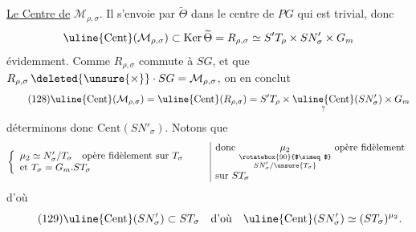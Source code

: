 
\uline{Le Centre de} $\mathcal M_{\rho,\sigma}$. Il s'envoie par $\widetilde\Theta$ dans le centre de $PG$ qui est trivial, donc
\[
\uline{\mathrm{Cent}}(\mathcal M_{\rho,\sigma})\subset\operatorname{Ker}\widetilde\Theta
=R_{\rho,\sigma}\simeq S'T_\rho\times SN'_\sigma\times G_m
\]
 évidemment. Comme $R_{\rho,\sigma}$ commute à $SG$, et que $R_{\rho,\sigma}\,\deleted{\unsure{\times}}\cdot SG=\mathcal M_{\rho,\sigma}$, on en conclut
\[
\tag{128}
\uline{\mathrm{Cent}}(\mathcal M_{\rho,\sigma})
=\uline{\mathrm{Cent}}(R_{\rho,\sigma})
=S'T_\rho\times\underset{?}{\uline{\mathrm{Cent}}}(SN'_\sigma)\times G_m
\]
déterminons donc $\mathrm{Cent}(SN'_\sigma)$. Notons que
\[
\left\{\begin{array}{l}
\mu_2\simeq N'_\sigma/T_\sigma\quad\text{opère fidèlement sur }T_\sigma\\
\text{et }T_\sigma=G_m.ST_\sigma
\end{array}\right.
\qquad
\begin{array}{|l}
\text{donc }\underset{\substack{\rotatebox{90}{$\simeq$}\\SN'_\sigma/\unsure{T_\sigma}}}{\mu_2}\text{ opère fidèlement}\\
\text{sur }ST_\sigma
\end{array}
\]
d'où
\[
\tag{129}
\uline{\mathrm{Cent}}(SN'_\sigma)\subset ST_\sigma
\quad\text{d'où}\quad
\uline{\mathrm{Cent}}(SN'_\sigma)\simeq(ST_\sigma)^{\mu_2}.
\]

